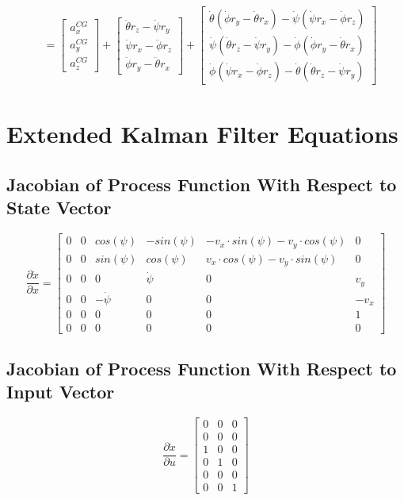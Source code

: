 \begin{align*}
&=\begin{bmatrix}a_{x}^{CG} \\ a_{y}^{CG} \\ a_{z}^{CG}\end{bmatrix}%
+\begin{bmatrix}\ddot{\theta}r_z - \ddot{\psi}r_y \\\ddot{\psi}r_x - \ddot{\phi}r_z \\\ddot{\phi}r_y - \ddot{\theta}r_x\end{bmatrix}%
+\begin{bmatrix}\dot{\theta}(\dot{\phi}r_y - \dot{\theta}r_x) - \dot{\psi}(\dot{\psi}r_x - \dot{\phi}r_z)\\\dot{\psi}(\dot{\theta}r_z - \dot{\psi}r_y) - \dot{\phi}(\dot{\phi}r_y - \dot{\theta}r_x)\\\dot{\phi}(\dot{\psi}r_x - \dot{\phi}r_z) - \dot{\theta}(\dot{\theta}r_z - \dot{\psi}r_y)\end{bmatrix}%
\end{align*}

\chapter{Extended Kalman Filter Equations}\label{sec:appendix-ekf-equations}

\section{Jacobian of Process Function With Respect to State Vector}
\begin{equation*}%
\frac{\partial \dot{x}}{\partial x} = \begin{bmatrix}%
0 & 0 & cos(\psi) & -sin(\psi) & -v_x \cdot sin(\psi) - v_y \cdot cos(\psi) & 0 \\%
0 & 0 & sin(\psi) & cos(\psi) & v_x \cdot cos(\psi) - v_y \cdot sin(\psi) & 0 \\%
0 & 0 & 0 & \dot{\psi} & 0 & v_y \\%
0 & 0 & -\dot{\psi} & 0 & 0 & -v_x \\%
0 & 0 & 0 & 0 & 0 & 1 \\%
0 & 0 & 0 & 0 & 0 & 0%
\end{bmatrix}%
\end{equation*}

\section{Jacobian of Process Function With Respect to Input Vector}
\begin{equation*}%
\frac{\partial \dot{x}}{\partial u} = \begin{bmatrix}%
0 & 0 & 0 \\%
0 & 0 & 0 \\%
1 & 0 & 0 \\%
0 & 1 & 0 \\%
0 & 0 & 0 \\%
0 & 0 & 1%
\end{bmatrix}%
\end{equation*}

